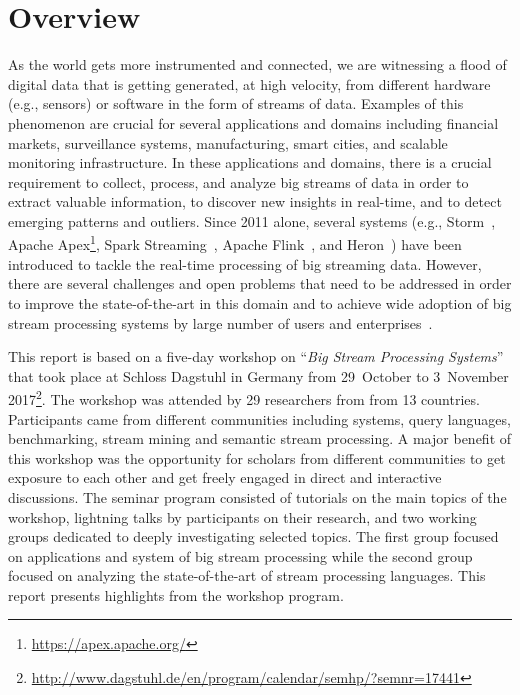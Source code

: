 \section{Overview}\label{sec:overview}

As the world gets more instrumented and connected, we are witnessing a
flood of digital data that is getting generated, at high velocity,
from different hardware (e.g., sensors) or software in the form of
streams of data. Examples of this phenomenon are crucial for several
applications and domains including financial markets, surveillance
systems, manufacturing, smart cities, and scalable monitoring
infrastructure. In these applications and domains, there is a crucial
requirement to collect, process, and analyze big streams of data in
order to extract valuable information, to discover new insights in
real-time, and to detect emerging patterns and outliers. Since 2011
alone, several systems (e.g.,
\textsf{Storm}~\cite{toshniwal_et_al_2014},
\textsf{Apache Apex}\footnote{\url{https://apex.apache.org/}},
\textsf{Spark Streaming}~\cite{zaharia_et_al_2013},
\textsf{Apache Flink}~\cite{carbone_et_al_2015}, and
\textsf{Heron}~\cite{kulkarni_et_al_2015}) have
been introduced to tackle the real-time processing of big streaming
data. However, there are several challenges and open problems that
need to be addressed in order to improve the state-of-the-art in this
domain and to achieve wide adoption of big stream processing systems
by large number of users and enterprises~\cite{sakr2016big}.

This report is based on a five-day workshop on ``\emph{Big Stream
  Processing Systems}'' that took place at Schloss Dagstuhl in Germany
from 29~October to 3~November 2017\footnote{\url{http://www.dagstuhl.de/en/program/calendar/semhp/?semnr=17441}}. The workshop was attended by 29
researchers from from 13 countries. Participants came from different
communities including systems, query languages, benchmarking, stream
mining and semantic stream processing. A major benefit of this
workshop was the opportunity for scholars from different communities
to get exposure to each other and get freely engaged in direct and
interactive discussions. The seminar program consisted of tutorials on
the main topics of the workshop, lightning talks by participants on
their research, and two working groups dedicated to deeply
investigating selected topics. The first group focused on applications
and system of big stream processing while the second group focused on
analyzing the state-of-the-art of stream processing languages. This
report presents highlights from the workshop program.

